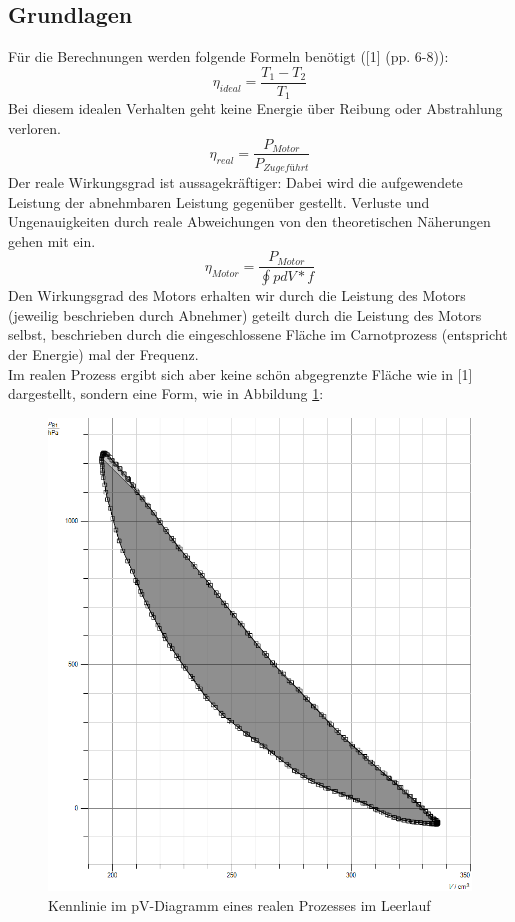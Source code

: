 \documentclass[12pt,a4paper]{article}
\begin{document}
\begin{multicols}{2}
\subsection{Grundlagen}
Für die Berechnungen werden folgende Formeln benötigt ([1] (pp. 6-8)):\\
$$\eta_{ideal} = \frac{T_1 - T_2}{T_1}$$
Bei diesem idealen Verhalten geht keine Energie über Reibung oder Abstrahlung verloren.
$$\eta_{real} = \frac{P_{Motor}}{P_{Zugeführt}}$$
Der reale Wirkungsgrad ist aussagekräftiger: Dabei wird die aufgewendete Leistung der abnehmbaren Leistung gegenüber gestellt. Verluste und Ungenauigkeiten durch reale Abweichungen von den theoretischen Näherungen gehen mit ein.
$$\eta_{Motor} = \frac{P_{Motor}}{\oint p dV * f}$$
Den Wirkungsgrad des Motors erhalten wir durch die Leistung des Motors (jeweilig beschrieben durch Abnehmer) geteilt durch die Leistung des Motors selbst, beschrieben durch die eingeschlossene Fläche im Carnotprozess (entspricht der Energie) mal der Frequenz. 
\\
Im realen Prozess ergibt sich aber keine schön abgegrenzte Fläche wie in [1] dargestellt, sondern eine Form, wie in Abbildung \ref{fig:real_carnot}:

\begin{figure}[H]
	\centering
	\includegraphics[scale=0.25]{./data/kennlinie_stirling_ohnelast.png}
	\caption{Kennlinie im pV-Diagramm eines realen Prozesses im Leerlauf}
	\label{fig:real_carnot}
\end{figure}


\end{multicols}
\end{document}
